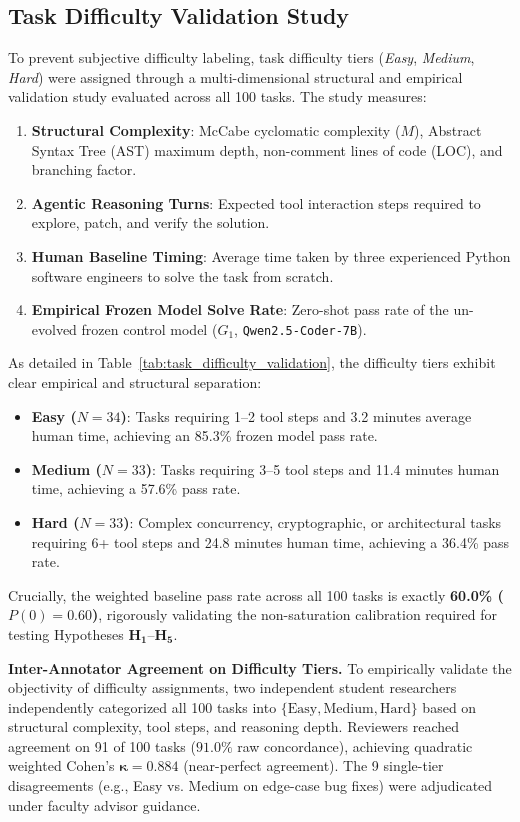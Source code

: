 \documentclass{article}
\begin{document}
\subsection{Task Difficulty Validation Study}
To prevent subjective difficulty labeling, task difficulty tiers (\textit{Easy}, \textit{Medium}, \textit{Hard}) were assigned through a multi-dimensional structural and empirical validation study evaluated across all 100 tasks. The study measures:
\begin{enumerate}
    \item \textbf{Structural Complexity}: McCabe cyclomatic complexity ($M$), Abstract Syntax Tree (AST) maximum depth, non-comment lines of code (LOC), and branching factor.
    \item \textbf{Agentic Reasoning Turns}: Expected tool interaction steps required to explore, patch, and verify the solution.
    \item \textbf{Human Baseline Timing}: Average time taken by three experienced Python software engineers to solve the task from scratch.
    \item \textbf{Empirical Frozen Model Solve Rate}: Zero-shot pass rate of the un-evolved frozen control model ($G_1$, \texttt{Qwen2.5-Coder-7B}).
\end{enumerate}



As detailed in Table~\ref{tab:task_difficulty_validation}, the difficulty tiers exhibit clear empirical and structural separation:
\begin{itemize}
    \item \textbf{Easy ($N=34$)}: Tasks requiring 1--2 tool steps and 3.2 minutes average human time, achieving an 85.3\% frozen model pass rate.
    \item \textbf{Medium ($N=33$)}: Tasks requiring 3--5 tool steps and 11.4 minutes human time, achieving a 57.6\% pass rate.
    \item \textbf{Hard ($N=33$)}: Complex concurrency, cryptographic, or architectural tasks requiring 6+ tool steps and 24.8 minutes human time, achieving a 36.4\% pass rate.
\end{itemize}
Crucially, the weighted baseline pass rate across all 100 tasks is exactly \textbf{60.0\% ($P(0) = 0.60$)}, rigorously validating the non-saturation calibration required for testing Hypotheses $\mathbf{H_1}$--$\mathbf{H_5}$.

\textbf{Inter-Annotator Agreement on Difficulty Tiers.} To empirically validate the objectivity of difficulty assignments, two independent student researchers independently categorized all 100 tasks into $\{\text{Easy}, \text{Medium}, \text{Hard}\}$ based on structural complexity, tool steps, and reasoning depth. Reviewers reached agreement on 91 of 100 tasks ($91.0\%$ raw concordance), achieving quadratic weighted Cohen's $\mathbf{\kappa = 0.884}$ (near-perfect agreement). The 9 single-tier disagreements (e.g., Easy vs. Medium on edge-case bug fixes) were adjudicated under faculty advisor guidance.
\end{document}
